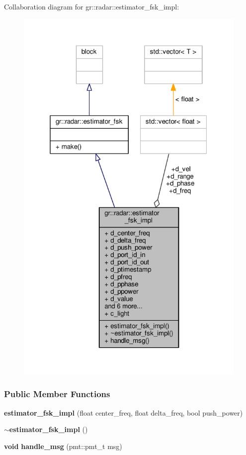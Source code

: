 Collaboration diagram for gr\+:\+:radar\+:\+:estimator\+\_\+fsk\+\_\+impl\+:
\nopagebreak
\begin{figure}[H]
\begin{center}
\leavevmode
\includegraphics[width=316pt]{dd/d6a/classgr_1_1radar_1_1estimator__fsk__impl__coll__graph}
\end{center}
\end{figure}
\subsubsection*{Public Member Functions}
\begin{DoxyCompactItemize}
\item 
{\bf estimator\+\_\+fsk\+\_\+impl} (float center\+\_\+freq, float delta\+\_\+freq, bool push\+\_\+power)
\item 
{\bf $\sim$estimator\+\_\+fsk\+\_\+impl} ()
\item 
{\bf void} {\bf handle\+\_\+msg} (pmt\+::pmt\+\_\+t msg)
\end{DoxyCompactItemize}
